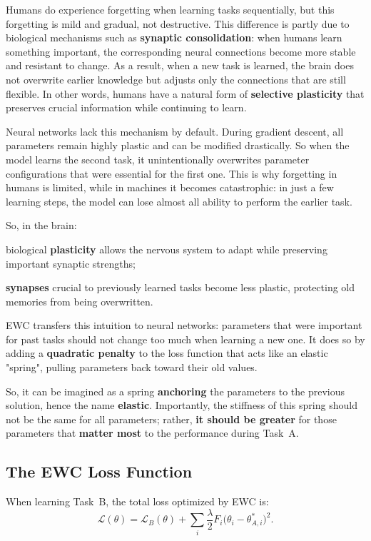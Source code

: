 Humans do experience forgetting when learning tasks sequentially, but this forgetting is mild
and gradual, not destructive. This difference is partly due to biological mechanisms such as
\textbf{synaptic consolidation}: when humans learn something important, the corresponding neural
connections become more stable and resistant to change. As a result, when a new task is
learned, the brain does not overwrite earlier knowledge but adjusts only the connections that
are still flexible. In other words, humans have a natural form of \textbf{selective plasticity} that
preserves crucial information while continuing to learn.

Neural networks lack this mechanism by default. During gradient descent, all parameters remain
highly plastic and can be modified drastically. So when the model learns the second task, it
unintentionally overwrites parameter configurations that were essential for the first one.
This is why forgetting in humans is limited, while in machines it becomes catastrophic: in
just a few learning steps, the model can lose almost all ability to perform the earlier task.

So, in the brain:
\begin{compactitemize}
    \item biological \textbf{plasticity} allows the nervous system to adapt while preserving important
    synaptic strengths;
    \item \textbf{synapses} crucial to previously learned tasks become less plastic, protecting old
    memories from being overwritten.
\end{compactitemize}

EWC transfers this intuition to neural networks: parameters that were important for past tasks
should not change too much when learning a new one. It does so by adding a \textbf{quadratic penalty}
to the loss function that acts like an elastic "spring", pulling parameters back toward
their old values.

So, it can be imagined as a spring \textbf{anchoring} the parameters to the previous solution, hence
the name \textbf{elastic}. Importantly, the stiffness of this spring should not be the same for
all parameters; rather, \textbf{it should be greater} for those parameters that \textbf{matter most} to the
performance during Task~A.

\subsection{The EWC Loss Function}
When learning Task~B, the total loss optimized by EWC is:
\[
\mathcal{L}(\theta)
=
\mathcal{L}_B(\theta)
+
\sum_i \frac{\lambda}{2}
F_i \bigl(\theta_i - \theta^{*}_{A,i}\bigr)^2.
\]

